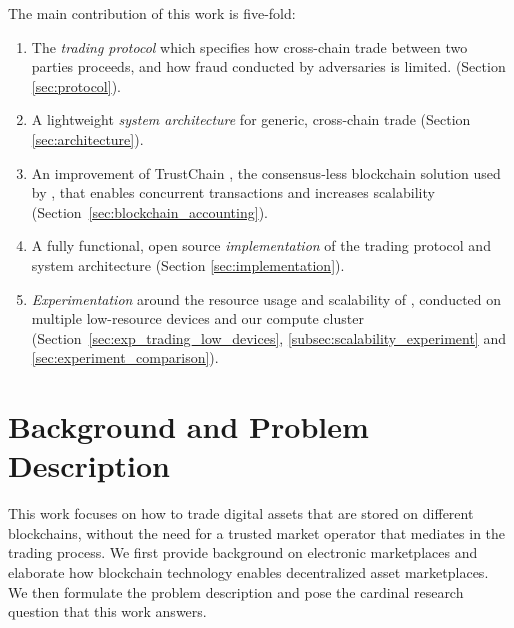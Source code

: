 The main contribution of this work is five-fold:
\begin{enumerate}
	\item The \ModelName{} \emph{trading protocol} which specifies how cross-chain trade between two parties proceeds, and how fraud conducted by adversaries is limited. (Section \ref{sec:protocol}). %
	\item A lightweight \emph{system architecture} for generic, cross-chain trade (Section \ref{sec:architecture}).
	\item An improvement of TrustChain \cite{otte2017trustchain}, the consensus-less blockchain solution used by \ModelName{}, that enables concurrent transactions and increases scalability (Section~\ref{sec:blockchain_accounting}).
	\item A fully functional, open source \emph{implementation} of the \ModelName{} trading protocol and system architecture (Section \ref{sec:implementation}).
	\item \emph{Experimentation} around the resource usage and scalability of \ModelName{}, conducted on multiple low-resource devices and our compute cluster (Section~\ref{sec:exp_trading_low_devices}, \ref{subsec:scalability_experiment} and \ref{sec:experiment_comparison}).
\end{enumerate}

\section{Background and Problem Description}
This work focuses on how to trade digital assets that are stored on different blockchains, without the need for a trusted market operator that mediates in the trading process.
We first provide background on electronic marketplaces and elaborate how blockchain technology enables decentralized asset marketplaces.
We then formulate the problem description and pose the cardinal research question that this work answers.

